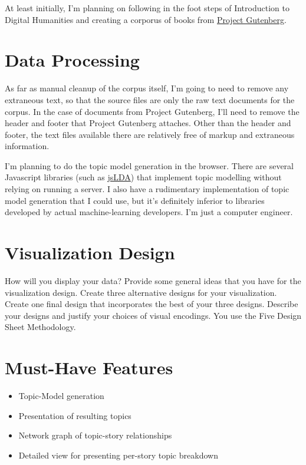 At least initially, I'm planning on following in the foot steps of
Introduction to Digital Humanities and creating a corporus of books from
\href{https://www.gutenberg.org/}{Project Gutenberg}.

\section{Data Processing}
As far as manual cleanup of the corpus itself, I'm going to need to
remove any extraneous text, so that the source files are only the raw
text documents for the corpus.  In the case of documents from Project
Gutenberg, I'll need to remove the header and footer that Project
Gutenberg attaches. Other than the header and footer, the text files
available there are relatively free of markup and extraneous
information.

I'm planning to do the topic model generation in the browser.  There are
several Javascript libraries (such as
\href{https://mimno.infosci.cornell.edu/jsLDA/}{jsLDA}) that implement
topic modelling without relying on running a server.  I also have a
rudimentary implementation of topic model generation that I could use,
but it's definitely inferior to libraries developed by actual
machine-learning developers.  I'm just a computer engineer.

\section{Visualization Design}
How will you display your data? Provide some general ideas that you have
for the visualization design. Create three alternative designs for your
visualization. Create one final design that incorporates the best of
your three designs. Describe your designs and justify your choices of
visual encodings. You use the Five Design Sheet Methodology.

\section{Must-Have Features}
\begin{itemize}
	\item Topic-Model generation
	\item Presentation of resulting topics
	\item Network graph of topic-story relationships
	\item Detailed view for presenting per-story topic breakdown
\end{itemize}

